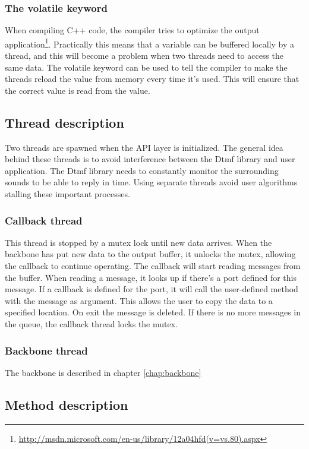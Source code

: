\subsubsection{The volatile keyword}
When compiling C++ code, the compiler tries to optimize the output application\footnote{\url{http://msdn.microsoft.com/en-us/library/12a04hfd(v=vs.80).aspx}}. Practically this means that a variable can be buffered locally by a thread, and this will become a problem when two threads need to access the same data. The volatile keyword can be used to tell the compiler to make the threads reload the value from memory every time it's used. This will ensure that the correct value is read from the value.

\subsection{Thread description}
\label{api_thread_description}
Two threads are spawned when the API layer is initialized. The general idea behind these threads is to avoid interference between the Dtmf library and user application. The Dtmf library needs to constantly monitor the surrounding sounds to be able to reply in time. Using separate threads avoid user algorithms stalling these important processes.

\subsubsection{Callback thread}
This thread is stopped by a mutex lock until new data arrives. When the backbone has put new data to the output buffer, it unlocks the mutex, allowing the callback to continue operating. The callback will start reading messages from the buffer. When reading a message, it looks up if there's a port defined for this message. If a callback is defined for the port, it will call the user-defined method with the message as argument. This allows the user to copy the data to a specified location. On exit the message is deleted. If there is no more messages in the queue, the callback thread locks the mutex.

\subsubsection{Backbone thread}
The backbone is described in chapter \ref{chap:backbone}

\subsection{Method description}
\label{sub:api_method_description}
